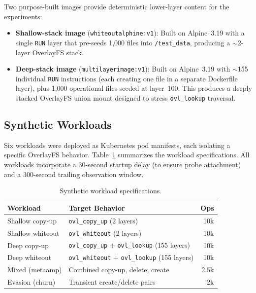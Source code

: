 \documentclass[conference]{IEEEtran}
\begin{document}
Two purpose-built images provide deterministic lower-layer content for the experiments:

\begin{itemize}
    \item \textbf{Shallow-stack image} (\texttt{whiteoutalphine:v1}): Built on Alpine~3.19 with a single \texttt{RUN} layer that pre-seeds 1,000 files into \texttt{/test\_data}, producing a $\sim$2-layer OverlayFS stack.
    \item \textbf{Deep-stack image} (\texttt{multilayerimage:v1}): Built on Alpine~3.19 with $\sim$155 individual \texttt{RUN} instructions (each creating one file in a separate Dockerfile layer), plus 1,000 operational files seeded at layer~100. This produces a deeply stacked OverlayFS union mount designed to stress \texttt{ovl\_lookup} traversal.
\end{itemize}

\subsection{Synthetic Workloads}
\label{subsec:workloads}

Six workloads were deployed as Kubernetes pod manifests, each isolating a specific OverlayFS behavior. Table~\ref{tab:workloads} summarizes the workload specifications. All workloads incorporate a 30-second startup delay (to ensure probe attachment) and a 300-second trailing observation window.

\begin{table}[t]
\centering
\caption{Synthetic workload specifications.}
\label{tab:workloads}
\small
\begin{tabular}{@{}p{2.2cm}p{2.8cm}r@{}}
\toprule
\textbf{Workload} & \textbf{Target Behavior} & \textbf{Ops} \\
\midrule
Shallow copy-up & \texttt{ovl\_copy\_up} (2 layers) & 10k \\
Shallow whiteout & \texttt{ovl\_whiteout} (2 layers) & 10k \\
Deep copy-up & \texttt{ovl\_copy\_up} + \texttt{ovl\_lookup} (155 layers) & 10k \\
Deep whiteout & \texttt{ovl\_whiteout} + \texttt{ovl\_lookup} (155 layers) & 10k \\
Mixed (metaamp) & Combined copy-up, delete, create & 2.5k \\
Evasion (churn) & Transient create/delete pairs & 2k \\
\bottomrule
\end{tabular}
\end{table}
\end{document}
